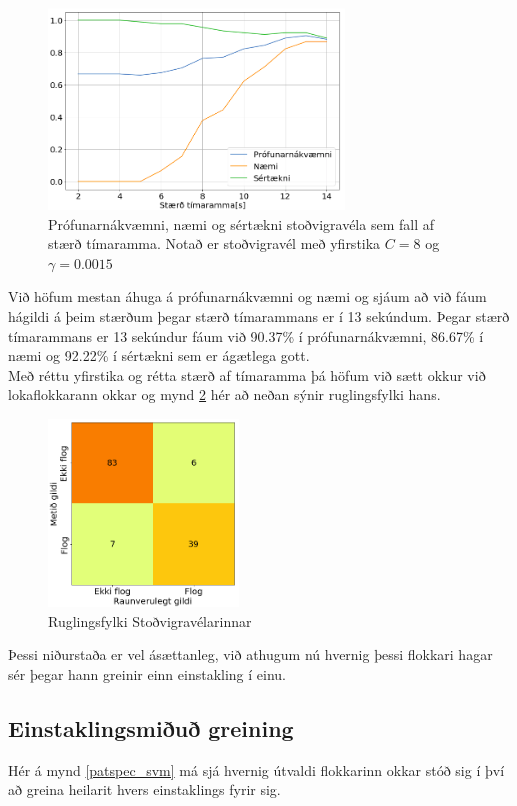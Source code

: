 \documentclass[11pt]{article}
\begin{document}
\begin{figure}[H]
    \centering
    \includegraphics[width=0.7\textwidth]{SVMtime.png}
    \caption{Prófunarnákvæmni, næmi og sértækni stoðvigravéla sem fall af stærð tímaramma. Notað er stoðvigravél með yfirstika $C=8$ og $\gamma=0.0015$}
    \label{fig:tlength}
\end{figure}
Við höfum mestan áhuga á prófunarnákvæmni og næmi og sjáum að við fáum hágildi á þeim stærðum þegar stærð tímarammans er í 13 sekúndum. Þegar stærð tímarammans er 13 sekúndur fáum við 90.37\% í prófunarnákvæmni, 86.67\% í næmi og 92.22\% í sértækni sem er ágætlega gott. \\

Með réttu yfirstika og rétta stærð af tímaramma þá höfum við sætt okkur við lokaflokkarann okkar og mynd \ref{svm_cm} hér að neðan sýnir ruglingsfylki hans.

\begin{figure}[H]
    \centering
    \includegraphics[width=0.45\textwidth]{svm_cm.png}
    \caption{Ruglingsfylki Stoðvigravélarinnar}
    \label{svm_cm}
\end{figure}

Þessi niðurstaða er vel ásættanleg, við athugum nú hvernig þessi flokkari hagar sér þegar hann greinir einn einstakling í einu.

\subsection{Einstaklingsmiðuð greining}
Hér á mynd \ref{patspec_svm} má sjá hvernig útvaldi flokkarinn okkar stóð sig í því að greina heilarit hvers einstaklings fyrir sig.
\end{document}

